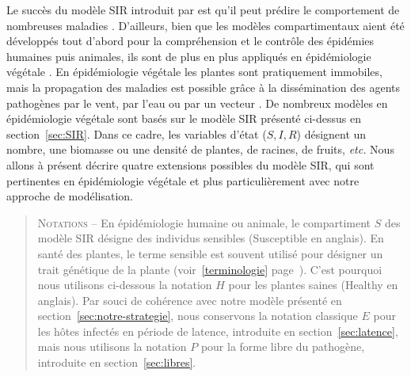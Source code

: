 	Le  succès du modèle SIR introduit par \citet{Kermack1932} est qu'il peut prédire le comportement de nombreuses maladies \citep{Brauer2012}. D'ailleurs, bien que les modèles compartimentaux aient été développés tout d'abord pour la compréhension et le contrôle  des épidémies  humaines puis animales, ils sont  de plus en plus appliqués en épidémiologie végétale \citep{Vanderplank1963, Madden2007,Gilligan2008}. %
	En épidémiologie végétale les plantes sont pratiquement immobiles, mais la propagation des maladies est possible grâce à la dissémination des agents pathogènes par le vent, par l’eau ou par un vecteur \citep{Madden2007}. De nombreux modèles en épidémiologie végétale sont basés sur le modèle SIR présenté ci-dessus en section~\ref{sec:SIR}. Dans ce cadre, les variables d'état ($S,I,R$) désignent un nombre, une biomasse ou une densité de plantes, de racines, de fruits, \textit{etc.} Nous allons à présent décrire quatre extensions  possibles du modèle SIR, qui sont pertinentes en épidémiologie végétale et plus particulièrement avec notre approche de modélisation.
	
	
\begin{quote}
	  \textsc{Notations} -- En épidémiologie humaine ou animale, le compartiment $S$ des modèle SIR désigne des individus sensibles (\og Susceptible \fg{} en anglais). En santé des plantes, le terme sensible est souvent utilisé pour désigner un trait génétique de la plante (voir~\ref{terminologie} page~\pageref{terminologie}). C'est pourquoi nous utilisons ci-dessous la notation $H$ pour les plantes saines (\og Healthy \fg{} en anglais). Par souci de cohérence avec notre modèle présenté en section~\ref{sec:notre-strategie}, nous conservons la notation classique $E$ pour les hôtes infectés en période de latence, introduite en section~\ref{sec:latence}, mais nous utilisons la notation $P$ pour la forme libre du pathogène, introduite en section~\ref{sec:libres}.
	\end{quote}

